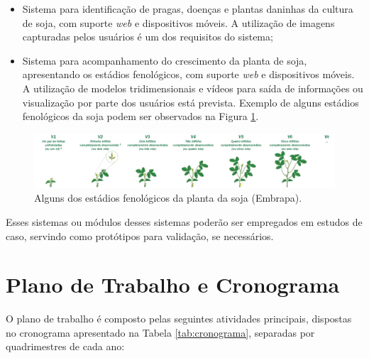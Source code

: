 \begin{itemize}
	\item Sistema para identificação de pragas, doenças e plantas daninhas da cultura de soja, com suporte \textit{web} e dispositivos móveis. A utilização de imagens capturadas pelos usuários é um dos requisitos do sistema;

	\item Sistema para acompanhamento do crescimento da planta de soja, apresentando os estádios fenológicos, com suporte \textit{web} e dispositivos móveis. A utilização de modelos tridimensionais e vídeos para saída de informações ou visualização por parte dos usuários está prevista. Exemplo de alguns estádios fenológicos da soja podem ser observados na Figura \ref{fig:estadios_fenelogicos}.
\end{itemize}

\begin{figure}
	\centering
  \includegraphics[scale=0.5]{images/EstadiosFenologicos.png}
  \caption{Alguns dos estádios fenológicos da planta da soja (Embrapa).}
  \label{fig:estadios_fenelogicos}
\end{figure} 

Esses sistemas ou módulos desses sistemas poderão ser empregados em estudos de caso, servindo como protótipos para validação, se necessários. 

\section{Plano de Trabalho e Cronograma}
\label{sec:plano_trabalho_cronograma}

O plano de trabalho é composto pelas seguintes atividades principais, dispostas no cronograma apresentado na Tabela \ref{tab:cronograma}, separadas por quadrimestres de cada ano:

